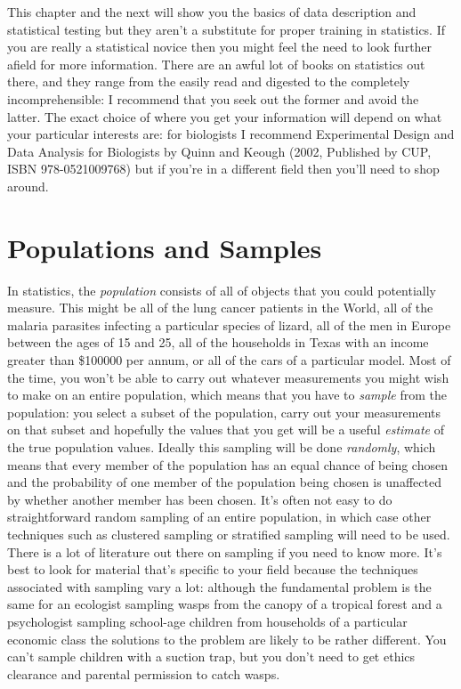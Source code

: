 \documentclass[
]{book}
\begin{document}
This chapter and the next will show you the basics of data description and statistical testing but they aren't a substitute for proper training in statistics. If you are really a statistical novice then you might feel the need to look further afield for more information. There are an awful lot of books on statistics out there, and they range from the easily read and digested to the completely incomprehensible: I recommend that you seek out the former and avoid the latter. The exact choice of where you get your information will depend on what your particular interests are: for biologists I recommend Experimental Design and Data Analysis for Biologists by Quinn and Keough (2002, Published by CUP, ISBN 978-0521009768) but if you're in a different field then you'll need to shop around.

\hypertarget{populations-and-samples}{%
\section{Populations and Samples}\label{populations-and-samples}}

In statistics, the \emph{population} consists of all of objects that you could potentially measure. This might be all of the lung cancer patients in the World, all of the malaria parasites infecting a particular species of lizard, all of the men in Europe between the ages of 15 and 25, all of the households in Texas with an income greater than \$100000 per annum, or all of the cars of a particular model. Most of the time, you won't be able to carry out whatever measurements you might wish to make on an entire population, which means that you have to \emph{sample} from the population: you select a subset of the population, carry out your measurements on that subset and hopefully the values that you get will be a useful \emph{estimate} of the true population values. Ideally this sampling will be done \emph{randomly}, which means that every member of the population has an equal chance of being chosen and the probability of one member of the population being chosen is unaffected by whether another member has been chosen. It's often not easy to do straightforward random sampling of an entire population, in which case other techniques such as clustered sampling or stratified sampling will need to be used. There is a lot of literature out there on sampling if you need to know more. It's best to look for material that's specific to your field because the techniques associated with sampling vary a lot: although the fundamental problem is the same for an ecologist sampling wasps from the canopy of a tropical forest and a psychologist sampling school-age children from households of a particular economic class the solutions to the problem are likely to be rather different. You can't sample children with a suction trap, but you don't need to get ethics clearance and parental permission to catch wasps.
\end{document}
